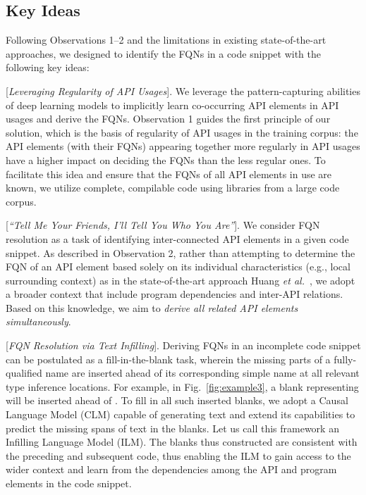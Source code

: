 \subsection{Key Ideas}
\label{sec:key}
Following Observations 1--2 and the limitations in existing state-of-the-art approaches, we designed {\tool} to identify the FQNs in a code snippet with the following key ideas:

\vspace{2pt}
 [{\em Leveraging Regularity of API Usages}].
We leverage the pattern-capturing abilities of deep learning models to implicitly learn co-occurring API elements in API usages and derive the FQNs. Observation 1 guides the first principle of our solution, which is the basis of regularity of API usages in the training corpus: the API elements (with their FQNs) appearing together more regularly in API usages have a higher impact on deciding the FQNs than the less regular ones. To facilitate this idea and ensure that the FQNs of all API elements in use are known, we utilize complete, compilable code using libraries from a large code corpus.

\vspace{2pt}
 [{\em ``Tell Me Your Friends, I'll Tell You
    Who You Are''}].  We consider FQN resolution as a task of
identifying inter-connected API elements in a given code snippet. As
described in Observation 2, rather than attempting to determine the
FQN of an API element based solely on its individual characteristics
(e.g., local surrounding context) as in the state-of-the-art approach
Huang {\em et al.}~\cite{prompt-ase22}, we adopt a broader 
context that include program dependencies and inter-API
relations. Based on this knowledge, we aim to {\em derive all related
API elements simultaneously}.


\vspace{2pt}
 [{\em FQN Resolution via Text Infilling}].
Deriving FQNs in an incomplete code snippet can be postulated as a fill-in-the-blank task, wherein the missing parts of a fully-qualified name are inserted ahead of its corresponding simple name at all relevant type inference locations. For example, in Fig.~\ref{fig:example3}, a blank representing  will be inserted ahead of . To fill in all such inserted blanks, we adopt a Causal Language Model (CLM) capable of generating text and extend its capabilities to predict the missing spans of text in the blanks. Let us call this framework an Infilling Language Model (ILM). The blanks thus constructed are consistent with the preceding and subsequent code, thus enabling the ILM to gain access to the wider context and learn from the dependencies among the API and program elements in the code snippet.
